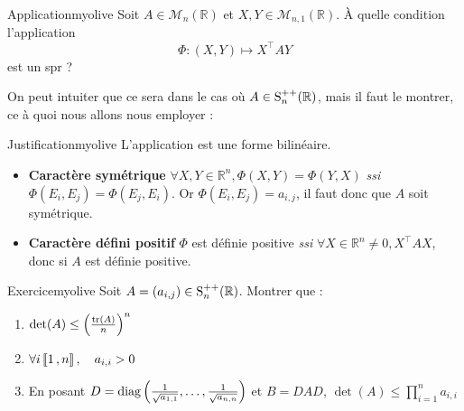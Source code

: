     \begin{omed}{Application}{myolive}
        Soit $A \in \mathcal{M}_n(\mathbb{R})$ et $X,Y \in \mathcal{M}_{n,1}(\mathbb{R})$. À quelle condition l’application
        \[ \Phi : (X,Y) \longmapsto X^{\top} A Y \]   
        est un spr ?
    \end{omed}

    On peut intuiter que ce sera dans le cas où $A \in \operatorname{S}^{++}_n(\mathbb{R})$, mais il faut le montrer, ce à quoi nous allons nous employer :

    \begin{demo}{Justification}{myolive}
        L’application est une forme bilinéaire. 
        \begin{itemize}
            \item \textbf{Caractère symétrique} \quad $\forall X,Y \in \mathbb{R}^n, \Phi(X,Y) = \Phi(Y,X)$ \textit{ssi} $\Phi(E_i, E_j) = \Phi(E_j, E_i)$. Or $\Phi(E_i,E_j) = a_{i,j}$, il faut donc que $A$ soit symétrique.
            \item \textbf{Caractère défini positif} $\Phi$ est définie positive \textit{ssi}  $\forall X \in \mathbb{R}^n \neq 0, X^{\top} A X$, donc si $A$ est définie positive.
        \end{itemize}
    \end{demo}

    \begin{omed}{Exercice}{myolive}
        Soit $A = (a_{i,j}) \in \operatorname{S}_n^{++}(\mathbb{R})$. Montrer que :
        \begin{enumerate}
            \item $\operatorname{det}(A) \leq \left(\frac{\operatorname{tr}(A)}{n}\right)^n$ 
            \item $\forall i \left\llbracket 1 \, , n \right\rrbracket, \quad a_{i,i} > 0$ 
            \item En posant $D = \operatorname{diag}\left(\frac{1}{\sqrt{a_{1,1}}}, \ldots, \frac{1}{\sqrt{a_{n,n}}}\right)$ et $B = DAD$, $\det(A) \leq \prod_{i=1}^{n} a_{i,i}$
        \end{enumerate}
    \end{omed}

